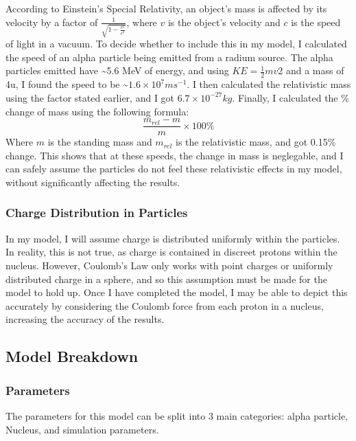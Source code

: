 \documentclass[11pt]{article}
\begin{document}
According to Einstein's Special Relativity, an object's mass is affected
by its velocity by a factor of
\(\frac {1}{\sqrt {1 - \frac {v^{2}}{c^{2}}}}\), where \(v\) is the
object's velocity and \(c\) is the speed of light in a vacuum. To decide
whether to include this in my model, I calculated the speed of an alpha
particle being emitted from a radium source. The alpha particles emitted
have \textasciitilde5.6 MeV of energy, and using
\(KE = \frac {1}{2}mv{2}\) and a mass of 4u, I found the speed to be
\textasciitilde{}\(1.6\times10^{7} m s^{-1}\). I then calculated the
relativistic mass using the factor stated earlier, and I got
\(6.7\times10^{-27}kg\). Finally, I calculated the \% change of mass
using the following formula: \[ \frac {m_{rel} - m}{m} \times 100\% \]
Where \(m\) is the standing mass and \(m_{rel}\) is the relativistic
mass, and got 0.15\% change. This shows that at these speeds, the change
in mass is neglegable, and I can safely assume the particles do not feel
these relativistic effects in my model, without significantly affecting
the results.

\hypertarget{charge-distribution-in-particles}{%
\subsubsection*{Charge Distribution in
Particles}\label{charge-distribution-in-particles}}

In my model, I will assume charge is distributed uniformly within the
particles. In reality, this is not true, as charge is contained in
discreet protons within the nucleus. However, Coulomb's Law only works
with point charges or uniformly distributed charge in a sphere, and so
this assumption must be made for the model to hold up. Once I have
completed the model, I may be able to depict this accurately by
considering the Coulomb force from each proton in a nucleus, increasing
the accuracy of the results.

    \hypertarget{model-breakdown}{%
\subsection{Model Breakdown}\label{model-breakdown}}

\hypertarget{parameters}{%
\subsubsection{Parameters}\label{parameters}}

The parameters for this model can be split into 3 main categories: alpha
particle, Nucleus, and simulation parameters.
\end{document}
